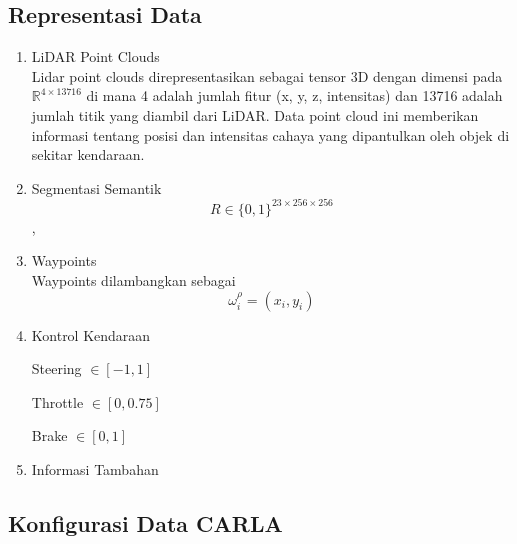 \subsection{Representasi Data}
\begin{enumerate}
    \item{LiDAR Point Clouds}\\
    Lidar point clouds direpresentasikan sebagai tensor 3D dengan dimensi pada
$
    \mathbb{R}^{4 \times 13716}
$
di mana 4 adalah jumlah fitur (x, y, z, intensitas) dan 13716 adalah jumlah titik yang diambil dari LiDAR. Data point cloud ini memberikan informasi tentang posisi dan intensitas cahaya yang dipantulkan oleh objek di sekitar kendaraan.


    \item{Segmentasi Semantik}\\
\begin{equation}
    R \in \{0, 1\}^{23 \times 256 \times 256}
\end{equation},
    \item{Waypoints}\\
Waypoints dilambangkan sebagai
\begin{equation}
    \omega_i^\rho = (x_i, y_i)
\end{equation}

    \item{Kontrol Kendaraan}\\
    \label{sec:kontrol_kendaraan}

Steering $\in [-1, 1]$

Throttle $\in [0, 0.75]$

Brake $\in [0, 1]$


    \item{Informasi Tambahan}\\
\end{enumerate}


\subsection{Konfigurasi Data CARLA}


